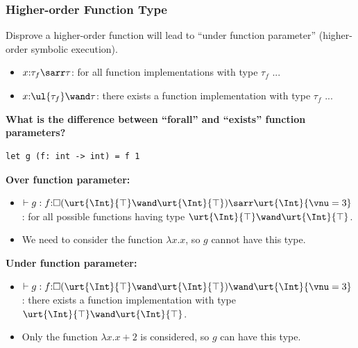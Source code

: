 \begin{frame}[fragile]
    \frametitle{Higher-order Function Type}

Disprove a higher-order function will lead to ``under function parameter'' (higher-order symbolic execution).

    \begin{itemize}
        \item $x{:}\tau_f\sarr\tau$: for all function implementations with type $\tau_f$ ...
        \item $x{:}\ul{\tau_f}\wand\tau$: there exists a function implementation with type $\tau_f$ ...
    \end{itemize}

\textbf{What is the difference between ``forall'' and ``exists'' function parameters?}

\begin{verbatim}
let g (f: int -> int) = f 1
\end{verbatim}

\textbf{Over function parameter:}
\begin{itemize}
    \item $\vdash g : f{:}\Box(\urt{\Int}{\top} \wand \urt{\Int}{\top}) \sarr \urt{\Int}{\vnu = 3}$: for all possible functions having type $\urt{\Int}{\top} \wand \urt{\Int}{\top}$.
    \item We need to consider the function $\lambda x. x$, so $g$ cannot have this type.
\end{itemize}

\textbf{Under function parameter:}
\begin{itemize}
    \item $\vdash g : f{:}\Box(\urt{\Int}{\top} \wand \urt{\Int}{\top}) \wand \urt{\Int}{\vnu = 3}$: there exists a function implementation with type $\urt{\Int}{\top} \wand \urt{\Int}{\top}$.
    \item Only the function $\lambda x. x+2$ is considered, so $g$ can have this type.
\end{itemize}
    
\end{frame}

